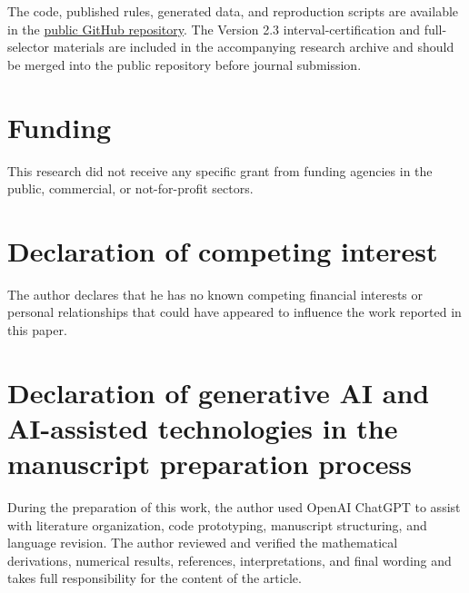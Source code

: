 \documentclass[preprint,12pt]{elsarticle}
\theoremstyle{remark}
\begin{document}
The code, published rules, generated data, and reproduction scripts are
available in the
\href{https://github.com/TurkeyOp/partial-moment-stieltjes-quadrature}{public GitHub repository}.
The Version 2.3 interval-certification and full-selector materials are included in the
accompanying research archive and should be merged into the public
repository before journal submission.

\section*{Funding}

This research did not receive any specific grant from funding agencies
in the public, commercial, or not-for-profit sectors.

\section*{Declaration of competing interest}

The author declares that he has no known competing financial interests
or personal relationships that could have appeared to influence the
work reported in this paper.

\section*{Declaration of generative AI and AI-assisted technologies in
the manuscript preparation process}

During the preparation of this work, the author used OpenAI ChatGPT to
assist with literature organization, code prototyping, manuscript
structuring, and language revision. The author reviewed and verified
the mathematical derivations, numerical results, references,
interpretations, and final wording and takes full responsibility for
the content of the article.
\end{document}
